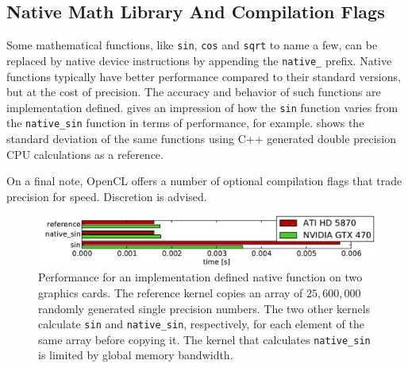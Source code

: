 \documentclass[11pt,twoside]{report}
\begin{document}



\newpage
\subsection{Native Math Library And Compilation Flags}
\label{sec:native}
Some mathematical functions, like {\tt sin}, {\tt cos} and {\tt sqrt} to name a few, can be replaced by native device instructions by appending the  {\tt native\_} prefix. Native functions typically have better performance compared to their standard versions, but at the cost of precision. The accuracy and behavior of such functions are implementation defined.  gives an impression of how the {\tt sin} function varies from the {\tt native\_sin} function in terms of performance, for example.   shows the standard deviation of the same functions using C++ generated  double precision CPU calculations as a reference.

\indent On a final note, OpenCL offers a number of optional compilation flags that trade precision for speed. Discretion is advised.

\begin{figure}[htbp]
	\begin{center}
		\includegraphics[width=\textwidth]{img/native_functions.pdf}		
	\end{center}
	\vspace{-10pt}
	\caption{Performance for an implementation defined native function on two graphics cards. The reference kernel copies an array of $25,600,000$ randomly generated single precision numbers. The two other kernels calculate {\tt sin} and {\tt native\_sin}, respectively, for each element of the same array before copying it. The kernel that calculates {\tt native\_sin} is limited by global memory bandwidth.}
	\label{fig:native_functions}
\end{figure}
\end{document}
